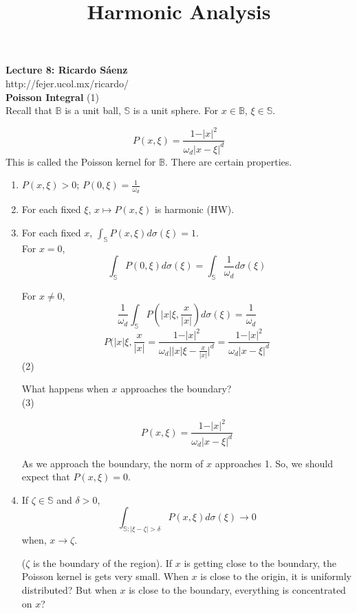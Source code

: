 \documentclass[12pt]{article}
\title{Harmonic Analysis}
\begin{document}
\noindent \textbf{Lecture 8: Ricardo S\'aenz} \\
\noindent http://fejer.ucol.mx/ricardo/ \\

\noindent \textbf{Poisson Integral} (1) \\
\noindent Recall that $\mathbb{B}$ is a unit ball, $\mathbb{S}$ is a unit sphere. For $x \in \mathbb{B}$, $\xi \in \mathbb{S}$.

$$P(x, \xi) = \frac{1 - \vert x \vert^2}{\omega_d \vert x - \xi \vert^d}$$
This is called the Poisson kernel for $\mathbb{B}$. There are certain properties.
\begin{enumerate}[itemsep=0pt, parsep=0pt, partopsep=0pt, topsep=0pt]
\item $P(x, \xi) > 0$; $P(0,\xi) = \frac{1}{\omega_d}$
\item For each fixed $\xi$, $x \mapsto P(x,\xi)$ is harmonic (HW).
\item For each fixed $x$, $\int_{\mathbb{S}} P(x,\xi)d\sigma(\xi)=1$. \\

For $x=0$, 
$$\int_{\mathbb{S}} P(0,\xi)d\sigma(\xi) = \int_\mathbb{S} \frac{1}{\omega_d} d\sigma(\xi)$$

For $x \not= 0$,
$$\frac{1}{\omega_d} \int_{\mathbb{S}}P(\vert x \vert \xi, \frac{x}{\vert x \vert }) d\sigma(\xi) = \frac{1}{\omega_d}$$
$$P(\vert x \vert \xi, \frac{x}{\vert x \vert} = \frac{1 - \vert x \vert^2}{\omega_d \vert \vert x \vert \xi - \frac{x}{\vert x \vert } \vert^d} = \frac{1-\vert x \vert^2}{\omega_d \vert x - \xi \vert^d }$$
(2)

\noindent What happens when $x$ approaches the boundary? \\

(3)

$$P(x,\xi) = \frac{1-\vert x \vert^2}{\omega_d \vert x - \xi \vert^d }$$

As we approach the boundary, the norm of $x$ approaches 1. So, we should expect that $P(x, \xi) =0$.

\item If $\zeta \in \mathbb{S}$ and $\delta>0$, 
$$\int_{\mathbb{S}: \vert \xi - \zeta \vert > \delta} P(x,\xi) d\sigma(\xi) \rightarrow 0$$
when, $x \rightarrow \zeta$. 

($\zeta$ is the boundary of the region). If $x$ is getting close to the boundary, the Poisson kernel is gets very small. When $x$ is close to the origin, it is uniformly distributed? But when $x$ is close to the boundary, everything is concentrated on $x$? \\


\end{enumerate}
\end{document}
